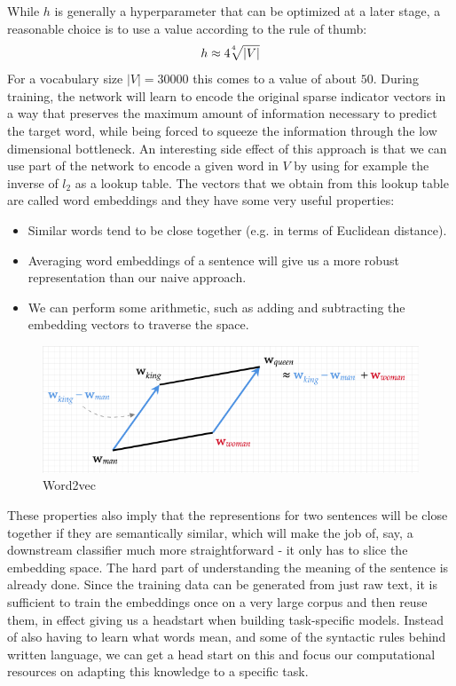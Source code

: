 While $h$ is generally a hyperparameter that can be optimized at a later stage, a reasonable choice is to use a value according to the rule of thumb:
\begin{equation}
  h \approx 4\sqrt[\leftroot{3} \uproot{3} 4]{|V|}
\end{equation}
For a vocabulary size $|V| = 30000$ this comes to a value of about $50$.
During training, the network will learn to encode the original sparse indicator vectors in a way that preserves the maximum amount of information necessary to predict the target word, while being forced to squeeze the information through the low dimensional bottleneck.
An interesting side effect of this approach is that we can use part of the network to encode a given word in $V$ by using for example the inverse of $l_2$ as a lookup table.
The vectors that we obtain from this lookup table are called word embeddings and they have some very useful properties:
\begin{itemize}
    \item Similar words tend to be close together (e.g. in terms of Euclidean distance).
    \item Averaging word embeddings of a sentence will give us a more robust representation than our naive approach.
    \item We can perform some arithmetic, such as adding and subtracting the embedding vectors to traverse the space.
\end{itemize}
\begin{figure}
  \includegraphics[width=\linewidth]{chapters/NLP/figures/king-man+woman.png}
  \caption{Word2vec}
  \label{fig:kingmanwoman}
\end{figure}
These properties also imply that the representions for two sentences will be close together if they are semantically similar, which will make the job of, say, a downstream classifier much more straightforward - it only has to slice the embedding space.
The hard part of understanding the meaning of the sentence is already done.
Since the training data can be generated from just raw text, it is sufficient to train the embeddings once on a very large corpus and then reuse them, in effect giving us a headstart when building task-specific models.\cite{pennington-etal-2014-glove}
Instead of also having to learn what words mean, and some of the syntactic rules behind written language, we can get a head start on this and focus our computational resources on adapting this knowledge to a specific task.

